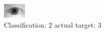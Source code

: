 \begin{figure}[h!]
\begin{center}
\includegraphics[width=0.60\columnwidth]{figures/ID1075_class_2_target_3.png}
\end{center}
\caption{ Classification: 2 actual target: 3}
\label{fig:ID1075_class_2_target_3}
\end{figure}
